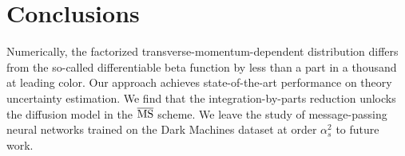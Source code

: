 \section{Conclusions}\label{sec:conclusions}

Numerically, the factorized transverse-momentum-dependent distribution
differs from the so-called differentiable beta function by less than a
part in a thousand at leading color. Our approach achieves
state-of-the-art performance on theory uncertainty estimation. We find
that the integration-by-parts reduction unlocks the diffusion model in
the $\overline{\rm MS}$ scheme. We leave the study of message-passing
neural networks trained on the Dark Machines dataset at order
$\alpha_s^2$ to future work.

